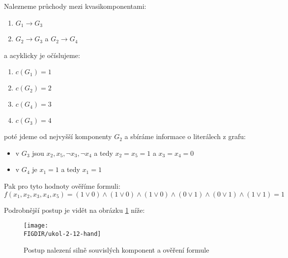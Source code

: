 \documentclass[10pt, a4paper]{ReportSheet}
\begin{document}
    Nalezneme průchody mezi kvasikomponentami:
    \begin{enumerate}
        \item $G_1 \rightarrow G_3$
        \item $G_2 \rightarrow G_3$ a $G_2 \rightarrow G_4$
    \end{enumerate}
    a acyklicky je očíslujeme:
    \begin{enumerate}
        \item $c(G_1) = 1$
        \item $c(G_2) = 2$
        \item $c(G_4) = 3$
        \item $c(G_3) = 4$
    \end{enumerate}
    poté jdeme od nejvyšší komponenty $G_2$ a sbíráme informace o literálech z grafu:
    \begin{itemize}
        \item v $G_3$ jsou $x_2, x_5, \neg x_3, \neg x_4$ a tedy $x_2 = x_5 = 1$ a $x_3 = x_4 = 0$
        \item v $G_4$ je $x_1 = 1$ a tedy $x_1 = 1$
    \end{itemize}

    Pak pro tyto hodnoty ověříme formuli:
    \begin{equation*}
        f(x_1, x_2, x_3, x_4, x_5) = (1 \lor 0) \land (1 \lor 0) \land
        (1 \lor 0) \land (0 \lor 1) \land (0 \lor 1) \land (1 \lor 1) = 1
    \end{equation*}

    Podrobnější postup je vidět na obrázku \ref{fig:ukol-2-12-hand} níže:
    \begin{figure}[H]
        \centering
        \texttt{[image: \\FIGDIR/ukol-2-12-hand]}
        \caption{Postup nalezení silně souvislých komponent a ověření formule}
        \label{fig:ukol-2-12-hand}
    \end{figure}

    \newpage

    \newpage
\end{document}
